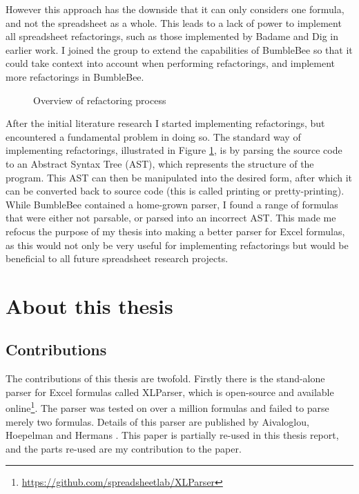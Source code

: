 \documentclass[12pt,a4paper,onecolumn,oneside,parskip]{memoir}
\begin{document}
However this approach has the downside that it can only considers one formula, and not the spreadsheet as a whole.
This leads to a lack of power to implement all spreadsheet refactorings, such as those implemented by Badame and Dig \cite{badame2012refactoring} in earlier work.
I joined the group to extend the capabilities of BumbleBee so that it could take context into account when performing refactorings, and implement more refactorings in BumbleBee.

\begin{figure}
\caption{Overview of refactoring process}
\label{fig:refactoring-process}
\centerfloat

\end{figure}

After the initial literature research I started implementing refactorings, but encountered a fundamental problem in doing so.
The standard way of implementing refactorings, illustrated in Figure \ref{fig:refactoring-process}, is by parsing the source code to an Abstract Syntax Tree (AST), which represents the structure of the program.
This AST can then be manipulated into the desired form, after which it can be converted back to source code (this is called printing or pretty-printing).
While BumbleBee contained a home-grown parser, I found a range of formulas that were either not parsable, or parsed into an incorrect AST.
This made me refocus the purpose of my thesis into making a better parser for Excel formulas, as this would not only be very useful for implementing refactorings but would be beneficial to all future spreadsheet research projects.

\section{About this thesis}

\subsection{Contributions}

The contributions of this thesis are twofold. Firstly there is the stand-alone parser for Excel formulas called XLParser, which is open-source and available online\footnote{\url{https://github.com/spreadsheetlab/XLParser}}. The parser was tested on over a million formulas and failed to parse merely two formulas.
Details of this parser are published by Aivaloglou, Hoepelman and Hermans \cite{xlparser}.
This paper is partially re-used in this thesis report, and the parts re-used are my contribution to the paper.
\end{document}
